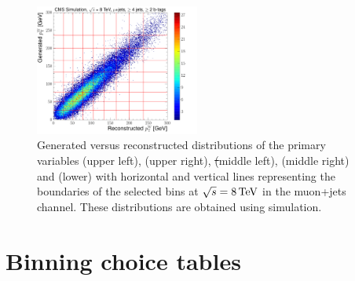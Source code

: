 \begin{figure}[hbtp]
	 \includegraphics[width=0.48\textwidth]{Chapters/04_Analysis/04b_XSections/images/binning/muon_WPT_8TeV.pdf}\hfill
	 \caption[Generated versus reconstructed distributions of the primary variables at $\sqrt{s}=8\TeV$ in the
	 muon+jets channel.]{Generated versus reconstructed distributions of the primary variables \met (upper left),
	 \HT (upper right), \st (middle left), \mt (middle right) and \wpt (lower) with horizontal and vertical lines
	 representing the boundaries of the selected bins at $\sqrt{s}=8\TeV$ in the muon+jets channel. These
	 distributions are obtained using \ttbar simulation.}
     \label{fig:binning_8TeV_muon}
 \end{figure}
 
\clearpage


\section{Binning choice tables}
\label{as:binning_tables_electron}






\clearpage


